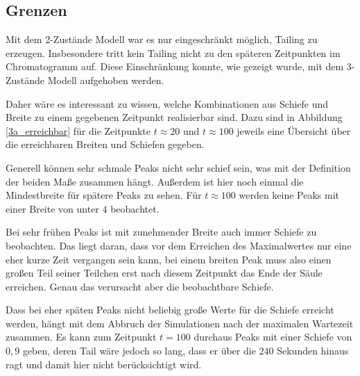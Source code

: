 \subsection{Grenzen}

Mit dem 2-Zustände Modell war es nur eingeschränkt möglich, Tailing zu erzeugen. Insbesondere tritt kein Tailing nicht zu den späteren Zeitpunkten im Chromatogramm auf. Diese Einschränkung konnte, wie gezeigt wurde, mit dem 3-Zustände Modell aufgehoben werden. 

Daher wäre es interessant zu wissen, welche Kombinationen aus Schiefe und Breite zu einem gegebenen Zeitpunkt realisierbar sind. Dazu sind in Abbildung \ref{3a_erreichbar} für die Zeitpunkte $t \approx 20$ und $ t \approx 100$ jeweils eine Übersicht über die erreichbaren Breiten und Schiefen gegeben.

Generell können sehr schmale Peaks nicht sehr schief sein, was mit der Definition der beiden Maße zusammen hängt. Außerdem ist hier noch einmal die Mindestbreite für spätere Peaks zu sehen. Für $t \approx 100$ werden keine Peaks mit einer Breite von unter $4$ beobachtet.

Bei sehr frühen Peaks ist mit zunehmender Breite auch immer Schiefe zu beobachten. Das liegt daran, dass vor dem Erreichen des Maximalwertes nur eine eher kurze Zeit vergangen sein kann, bei einem breiten Peak muss also einen großen Teil seiner Teilchen erst nach diesem Zeitpunkt das Ende der Säule erreichen. Genau das verursacht aber die beobachtbare Schiefe.

Dass bei eher späten Peaks nicht beliebig große Werte für die Schiefe erreicht werden, hängt mit dem Abbruch der Simulationen nach der maximalen Wartezeit zusammen. Es kann zum Zeitpunkt $t = 100$ durchaus Peaks mit einer Schiefe von $0,9$ geben, deren Tail wäre jedoch so lang, dass er über die $240$ Sekunden hinaus ragt und damit hier nicht berücksichtigt wird.

